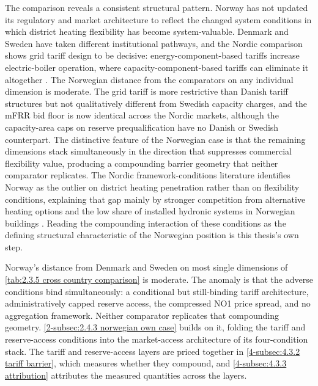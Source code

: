The comparison reveals a consistent structural pattern. Norway has not updated its regulatory and market architecture to reflect the changed system conditions in which district heating flexibility has become system-valuable. Denmark and Sweden have taken different institutional pathways, and the Nordic comparison shows grid tariff design to be decisive: energy-component-based tariffs increase electric-boiler operation, where capacity-component-based tariffs can eliminate it altogether \cite{sneum_economic_2018}. The Norwegian distance from the comparators on any individual dimension is moderate. The grid tariff is more restrictive than Danish tariff structures but not qualitatively different from Swedish capacity charges, and the mFRR bid floor is now identical across the Nordic markets, although the capacity-area caps on reserve prequalification have no Danish or Swedish counterpart. The distinctive feature of the Norwegian case is that the remaining dimensions stack simultaneously in the direction that suppresses commercial flexibility value, producing a compounding barrier geometry that neither comparator replicates. The Nordic framework-conditions literature identifies Norway as the outlier on district heating penetration rather than on flexibility conditions, explaining that gap mainly by stronger competition from alternative heating options and the low share of installed hydronic systems in Norwegian buildings \cite{sandberg_framework_2018}. Reading the compounding interaction of these conditions as the defining structural characteristic of the Norwegian position is this thesis's own step. 

\newpage
\begin{keypoint}
Norway's distance from Denmark and Sweden on most single dimensions of \autoref{tab:2.3.5 cross country comparison} is moderate. The anomaly is that the adverse conditions bind simultaneously: a conditional but still-binding tariff architecture, administratively capped reserve access, the compressed NO1 price spread, and no aggregation framework. Neither comparator replicates that compounding geometry. \autoref{2-subsec:2.4.3 norwegian own case} builds on it, folding the tariff and reserve-access conditions into the market-access architecture of its four-condition stack. The tariff and reserve-access layers are priced together in \autoref{4-subsec:4.3.2 tariff barrier}, which measures whether they compound, and \autoref{4-subsec:4.3.3 attribution} attributes the measured quantities across the layers. 
\end{keypoint}

